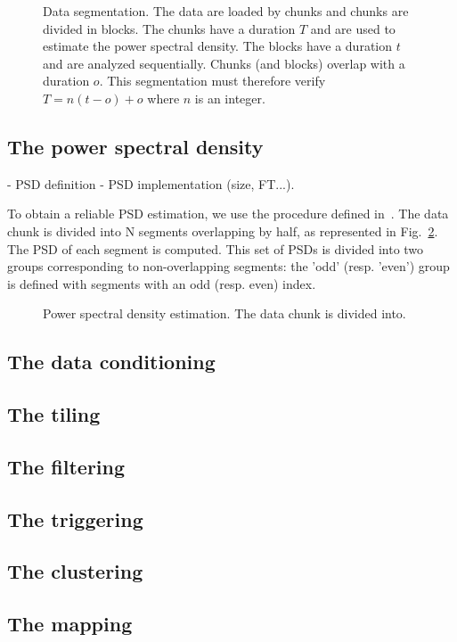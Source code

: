 \begin{figure}
  \center
  \caption{Data segmentation. The data are loaded by chunks and chunks are divided in blocks. The chunks have a duration $T$ and are used to estimate the power spectral density. The blocks have a duration $t$ and are analyzed sequentially. Chunks (and blocks) overlap with a duration $o$. This segmentation must therefore verify $T=n(t-o)+o$ where $n$ is an integer.}
  \label{fig:segmentation}
\end{figure}

\subsection{The power spectral density} \label{sec:algorithm:psd}
- PSD definition - PSD implementation (size, FT...).

To obtain a reliable PSD estimation, we use the procedure defined in~\cite{psd}.
The data chunk is divided into N segments overlapping by half, as represented in Fig.~\ref{fig:mmm}. The PSD of each segment is computed. This set of PSDs is divided into two groups corresponding to non-overlapping segments: the 'odd' (resp. 'even') group is defined with segments with an odd (resp. even) index.
\begin{figure}
  \center
  \caption{Power spectral density estimation. The data chunk is divided into.}
  \label{fig:mmm}
\end{figure}

\subsection{The data conditioning} \label{sec:algorithm:conditioning}

\subsection{The tiling} \label{sec:algorithm:tiling}

\subsection{The filtering} \label{sec:algorithm:conditioning}

\subsection{The triggering} \label{sec:algorithm:triggering}

\subsection{The clustering} \label{sec:algorithm:conditioning}

\subsection{The mapping} \label{sec:algorithm:mapping}
